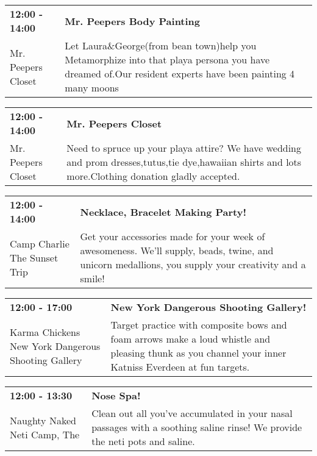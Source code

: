 \begin{tabular}{ p{1in} p{2.2in} }
    \textbf{12:00 - 14:00} & \textbf{Mr. Peepers Body Painting } \\
    Mr. Peepers Closet \newline  & Let Laura\&George(from bean town)help you Metamorphize into that playa persona you have dreamed of.Our resident experts have been painting 4 many moons \\
    \hline 
\end{tabular}
    
\begin{tabular}{ p{1in} p{2.2in} }
    \textbf{12:00 - 14:00} & \textbf{Mr. Peepers Closet} \\
    Mr. Peepers Closet \newline  & Need to spruce up your playa attire? We have wedding and prom dresses,tutus,tie dye,hawaiian shirts and lots more.Clothing donation gladly accepted. \\
    \hline 
\end{tabular}
    
\begin{tabular}{ p{1in} p{2.2in} }
    \textbf{12:00 - 14:00} & \textbf{Necklace, Bracelet Making Party! } \\
    Camp Charlie \newline The Sunset Trip & Get your accessories made for your week of awesomeness.  We'll supply, beads, twine, and unicorn medallions, you supply your creativity and a smile! \\
    \hline 
\end{tabular}
    
\begin{tabular}{ p{1in} p{2.2in} }
    \textbf{12:00 - 17:00} & \textbf{New York Dangerous Shooting Gallery!} \\
    Karma Chickens \newline New York Dangerous Shooting Gallery & Target practice with composite bows and foam arrows make a loud whistle and pleasing thunk as you channel your inner Katniss Everdeen at fun targets. \\
    \hline 
\end{tabular}
    
\begin{tabular}{ p{1in} p{2.2in} }
    \textbf{12:00 - 13:30} & \textbf{Nose Spa! } \\
    Naughty Naked Neti Camp, The \newline  & Clean out all you've accumulated in your nasal passages with a soothing saline rinse! We provide the neti pots and saline. \\
    \hline 
\end{tabular}
    
